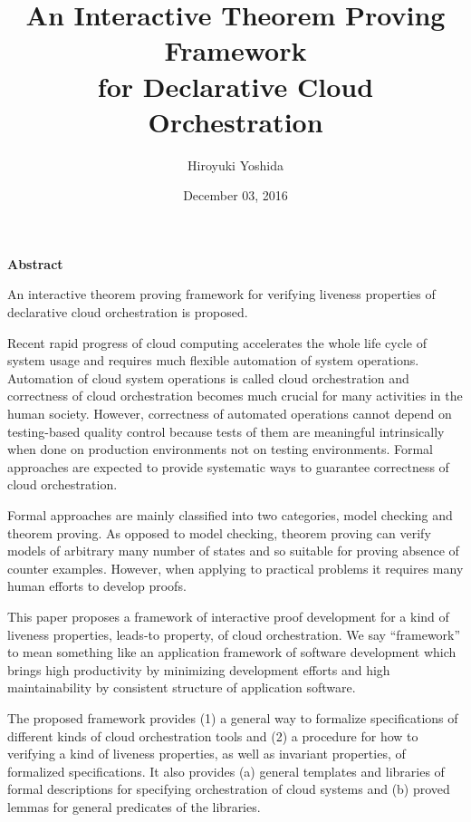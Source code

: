 \documentclass[12pt]{report}
\title{An Interactive Theorem Proving Framework\\for Declarative Cloud Orchestration}
\author{Hiroyuki Yoshida}
\date{December 03, 2016}
\begin{document}
\maketitle
{}  %
\setcounter{page}{1}
\strut
\vspace{20pt}
\begin{center}
{\LARGE\bf Abstract}
\end{center}
\vspace{20pt}
An interactive theorem proving framework for verifying liveness
properties of declarative cloud orchestration is proposed.

Recent rapid progress of cloud computing accelerates the whole life
cycle of system usage and requires much flexible automation of system
operations. Automation of cloud system operations is called cloud
orchestration and correctness of cloud orchestration becomes much
crucial for many activities in the human society.  However,
correctness of automated operations cannot depend on testing-based
quality control because tests of them are meaningful intrinsically
when done on production environments not on testing environments.
Formal approaches are expected to provide systematic ways to guarantee
correctness of cloud orchestration.

Formal approaches are mainly classified into two categories, model
checking and theorem proving. As opposed to model checking, theorem
proving can verify models of arbitrary many number of states and so
suitable for proving absence of counter examples. However, when
applying to practical problems it requires many human efforts to
develop proofs.

This paper proposes a framework of interactive proof development for a
kind of liveness properties, leads-to property, of cloud
orchestration. We say ``framework'' to mean something like an
application framework of software development which brings high
productivity by minimizing development efforts and high
maintainability by consistent structure of application software.

The proposed framework provides (1) a general way to formalize
specifications of different kinds of cloud orchestration tools and (2)
a procedure for how to verifying a kind of liveness properties, as
well as invariant properties, of formalized specifications.  It also
provides (a) general templates and libraries of formal descriptions
for specifying orchestration of cloud systems and (b) proved lemmas
for general predicates of the libraries.
\end{document}
